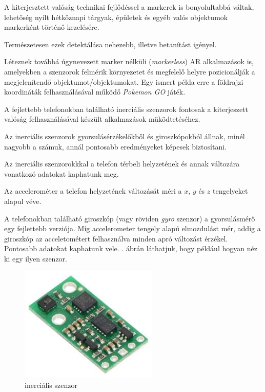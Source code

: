
A kiterjesztett valóság technikai fejlődéssel a markerek is bonyolultabbá váltak, lehetőség nyílt hétköznapi tárgyak, épületek és egyéb valós objektumok markerként történő kezelésére.

Természetesen ezek detektálása nehezebb, illetve betanítást igényel.

Léteznek továbbá úgynevezett marker nélküli (\textit{markerless}) AR alkalmazások is, amelyekben a szenzorok felmérik környezetet és megfelelő helyre pozicionálják a megjelenítendő objektumot/objektumokat. Egy ismert példa erre a földrajzi koordináták felhasználásával működő \textit{Pokemon GO} játék.


A fejlettebb telefonokban található inerciális szenzorok fontosak a kiterjeszett valóság felhasználásával készült alkalmazások müködtetéséhez.

Az inerciális szenzorok gyorsulásérzékelőkből és giroszkópokból állnak, minél nagyobb a számuk, annál pontosabb eredményeket képesek biztosítani.

Az inerciális szenzorokkkal a telefon térbeli helyzetének és annak változára vonatkozó adatokat kaphatunk meg.

Az accelerométer a telefon helyzetének változását méri a $x$, $y$ és $z$ tengelyeket alapul véve.

A telefonokban található giroszkóp (vagy röviden \textit{gyro} szenzor) a gyorsulásmérő egy fejlettebb verziója.
Míg accelerometer tengely alapú elmozdulást mér, addig a giroszkóp az acceletométert felhasználva minden apró változást érzékel. Pontosabb adatokat kaphatunk vele.
. ábrán láthatjuk, hogy például hogyan néz ki egy ilyen szenzor.

\begin{figure}[htp]
    \centering
   	\includegraphics[scale=3]{images/inertial.jpg}
	\caption{inerciális szenzor}
	\label{fig:inertial}
\end{figure}

